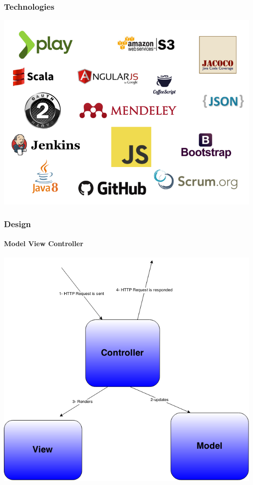 \documentclass{beamer}
\begin{document}
\begin{frame}
\frametitle{Technologies}
\centering
\includegraphics[scale=0.16]{./images/presentation_techlogos.png}
\end{frame}
\begin{frame}
\frametitle{Design}\framesubtitle{Model View Controller}
\centering
\includegraphics[scale=0.26]{./images/MVCdiag.png}
\end{frame}
\end{document}
